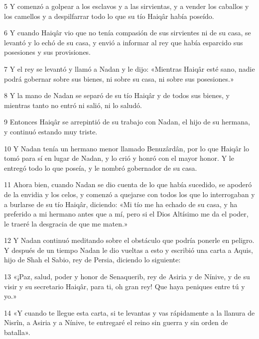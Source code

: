 \par 5 Y comenzó a golpear a los esclavos y a las sirvientas, y a vender los caballos y los camellos y a despilfarrar todo lo que su tío Haiqâr había poseído.

\par 6 Y cuando Haiqâr vio que no tenía compasión de sus sirvientes ni de su casa, se levantó y lo echó de su casa, y envió a informar al rey que había esparcido sus posesiones y sus provisiones.

\par 7 Y el rey se levantó y llamó a Nadan y le dijo: «Mientras Haiqâr esté sano, nadie podrá gobernar sobre sus bienes, ni sobre su casa, ni sobre sus posesiones.»

\par 8 Y la mano de Nadan se separó de su tío Haiqâr y de todos sus bienes, y mientras tanto no entró ni salió, ni lo saludó.

\par 9 Entonces Haiqâr se arrepintió de su trabajo con Nadan, el hijo de su hermana, y continuó estando muy triste.

\par 10 Y Nadan tenía un hermano menor llamado Benuzârdân, por lo que Haiqâr lo tomó para sí en lugar de Nadan, y lo crió y honró con el mayor honor. Y le entregó todo lo que poseía, y le nombró gobernador de su casa.

\par 11 Ahora bien, cuando Nadan se dio cuenta de lo que había sucedido, se apoderó de la envidia y los celos, y comenzó a quejarse con todos los que lo interrogaban y a burlarse de su tío Haiqâr, diciendo: «Mi tío me ha echado de su casa, y ha preferido a mi hermano antes que a mí, pero si el Dios Altísimo me da el poder, le traeré la desgracia de que me maten.»

\par 12 Y Nadan continuó meditando sobre el obstáculo que podría ponerle en peligro. Y después de un tiempo Nadan le dio vueltas a esto y escribió una carta a Aquis, hijo de Shah el Sabio, rey de Persia, diciendo lo siguiente:

\par 13 «¡Paz, salud, poder y honor de Senaquerib, rey de Asiria y de Nínive, y de su visir y su secretario Haiqâr, para ti, oh gran rey! Que haya peniques entre tú y yo.»

\par 14 «Y cuando te llegue esta carta, si te levantas y vas rápidamente a la llanura de Nisrîn, a Asiria y a Nínive, te entregaré el reino sin guerra y sin orden de batalla».

